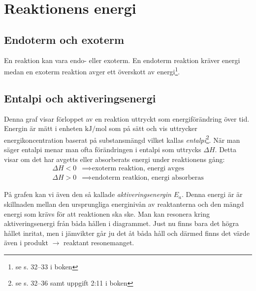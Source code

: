 \section{Reaktionens energi}

\subsection{Endoterm och exoterm}
\label{sec:endoexo}
En reaktion kan vara endo- eller exoterm. En endoterm reaktion kräver energi medan en exoterm reaktion avger ett överskott av energi\footnote{se s. 32--33 i boken}.

\subsection{Entalpi och aktiveringsenergi}
\label{sec:entalpiaktiveringse}
\begin{figure*}[h]
    \centering
\end{figure*}

\noindent Denna graf visar förloppet av en reaktion uttryckt som energiförändring över tid. Energin är mätt i enheten $\mathrm{kJ/mol}$ som på sätt och vis uttrycker energikoncentration baserat på substansmängd vilket kallas \emph{entalpi}\footnote{se s. 32--36 samt uppgift 2:11 i boken}. När man säger entalpi menar man ofta förändringen i entalpi som uttrycks $\Delta H$. Detta visar om det har avgetts eller absorberats energi under reaktionens gång:
\begin{align*}
    \Delta H < 0 &\implies \text{exoterm reaktion, energi avges} \\
    \Delta H > 0 &\implies \text{endoterm reatkion, energi absorberas}
\end{align*}

På grafen kan vi även den så kallade \emph{aktiveringsenergin} $E_a$. Denna energi är är skillnaden mellan den ursprungliga energinivån av reaktanterna och den mängd energi som krävs för att reaktionen ska ske. Man kan resonera kring aktiveringsenergi från båda hållen i diagrammet. Just nu finns bara det högra hållet inritat, men i jämvikter går ju det åt båda håll och därmed finns det värde även i produkt $\rightarrow$ reaktant resonemanget.